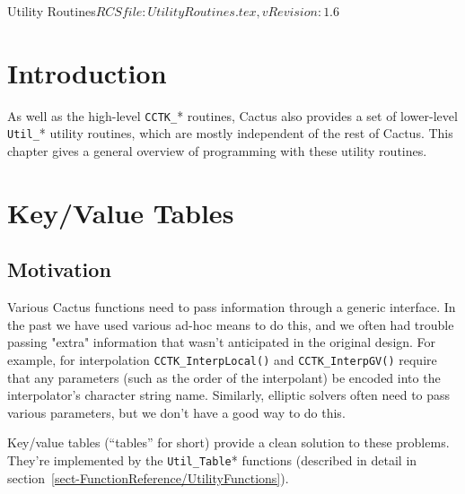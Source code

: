 \begin{cactuspart}{3}{Utility Routines}{$RCSfile: UtilityRoutines.tex,v $}{$Revision: 1.6 $}
\renewcommand{\thepage}{\Alph{part}\arabic{page}}


\chapter{Introduction} 

As well as the high-level \verb|CCTK_|* routines, Cactus also
provides a set of lower-level \verb|Util_|* utility routines, which
are mostly independent of the rest of Cactus.  This chapter gives a
general overview of programming with these utility routines.


\chapter{Key/Value Tables}


\section{Motivation}

Various Cactus functions need to pass information through a generic
interface.  In the past we have used various ad-hoc means to do this,
and we often had trouble passing "extra" information that wasn't
anticipated in the original design.  For example, for interpolation
\verb|CCTK_InterpLocal()| and \verb|CCTK_InterpGV()| require that
any parameters (such as the order of the interpolant) be encoded
into the interpolator's character string name.  Similarly, elliptic
solvers often need to pass various parameters, but we don't have a
good way to do this.

Key/value tables (``tables'' for short) provide a clean solution
to these problems.  They're implemented by the \verb|Util_Table|*
functions (described in detail in
section~\ref{sect-FunctionReference/UtilityFunctions}).


\end{cactuspart}
